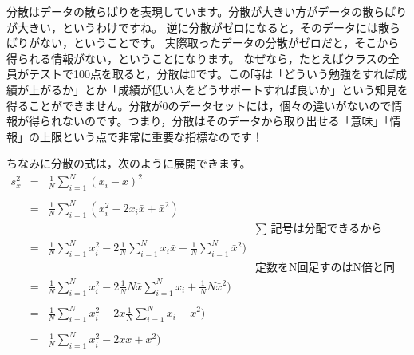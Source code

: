 \documentclass{ltjbook}
\begin{document}
分散はデータの散らばりを表現しています。分散が大きい方がデータの散らばりが大きい，というわけですね。
逆に分散がゼロになると，そのデータには散らばりがない，ということです。
実際取ったデータの分散がゼロだと，そこから得られる情報がない，ということになります。
なぜなら，たとえばクラスの全員がテストで100点を取ると，分散は0です。この時は「どういう勉強をすれば成績が上がるか」とか「成績が低い人をどうサポートすれば良いか」という知見を得ることができません。分散が0のデータセットには，個々の違いがないので情報が得られないのです。つまり，分散はそのデータから取り出せる「意味」「情報」の上限という点で非常に重要な指標なのです！

ちなみに分散の式は，次のように展開できます。
\[
	\begin{array}{lllr}\label{ref:variance_form2}
		s_x^2 & = & \frac{1}{N}\sum_{i=1}^N (x_i - \bar{x})^2                                                                                           \\
		\\
		      & = & \frac{1}{N}\sum_{i=1}^N (x_i^2 - 2x_i\bar{x} + \bar{x}^2)                                                                           \\
		      &   &                                                                                                          & \mbox{$\sum$ 記号は分配できるから} \\
		      & = & \frac{1}{N}\sum_{i=1}^N x_i^2 - 2\frac{1}{N}\sum_{i=1}^N x_i\bar{x} + \frac{1}{N}\sum_{i=1}^N \bar{x}^2)                            \\
		      &   &                                                                                                          & \mbox{定数をN回足すのはN倍と同じなので} \\
		      & = & \frac{1}{N}\sum_{i=1}^N x_i^2 - 2\frac{1}{N}N\bar{x}\sum_{i=1}^N x_i + \frac{1}{N}N\bar{x}^2)                                       \\
		      &   &                                                                                                                                     \\
		      & = & \frac{1}{N}\sum_{i=1}^N x_i^2 - 2\bar{x}\frac{1}{N}\sum_{i=1}^N x_i + \bar{x}^2)                                                    \\
		      &   &                                                                                                                                     \\
		      & = & \frac{1}{N}\sum_{i=1}^N x_i^2 - 2\bar{x}\bar{x}+ \bar{x}^2)                                                                         \\

\end{array}\]
\end{document}
